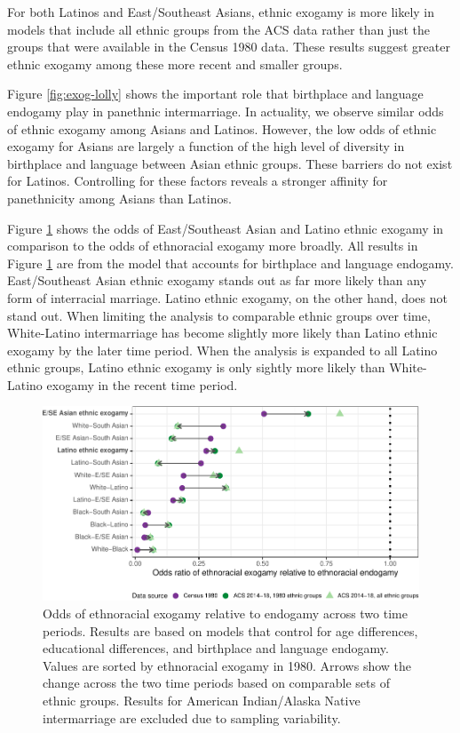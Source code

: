 \documentclass[11pt,]{article}
\begin{document}
For both Latinos and East/Southeast Asians, ethnic exogamy is more likely in models that include all ethnic groups from the ACS data rather than just the groups that were available in the Census 1980 data. These results suggest greater ethnic exogamy among these more recent and smaller groups.

Figure \ref{fig:exog-lolly} shows the important role that birthplace and language endogamy play in panethnic intermarriage. In actuality, we observe similar odds of ethnic exogamy among Asians and Latinos. However, the low odds of ethnic exogamy for Asians are largely a function of the high level of diversity in birthplace and language between Asian ethnic groups. These barriers do not exist for Latinos. Controlling for these factors reveals a stronger affinity for panethnicity among Asians than Latinos.

Figure \ref{fig:changes-intermar} shows the odds of East/Southeast Asian and Latino ethnic exogamy in comparison to the odds of ethnoracial exogamy more broadly. All results in Figure \ref{fig:changes-intermar} are from the model that accounts for birthplace and language endogamy. East/Southeast Asian ethnic exogamy stands out as far more likely than any form of interracial marriage. Latino ethnic exogamy, on the other hand, does not stand out. When limiting the analysis to comparable ethnic groups over time, White-Latino intermarriage has become slightly more likely than Latino ethnic exogamy by the later time period. When the analysis is expanded to all Latino ethnic groups, Latino ethnic exogamy is only sightly more likely than White-Latino exogamy in the recent time period.

\begin{figure}
\centering
\includegraphics{main_files/figure-latex/changes-intermar-1.pdf}
\caption{\label{fig:changes-intermar}Odds of ethnoracial exogamy relative to endogamy across two time periods. Results are based on models that control for age differences, educational differences, and birthplace and language endogamy. Values are sorted by ethnoracial exogamy in 1980. Arrows show the change across the two time periods based on comparable sets of ethnic groups. Results for American Indian/Alaska Native intermarriage are excluded due to sampling variability.}
\end{figure}
\end{document}
